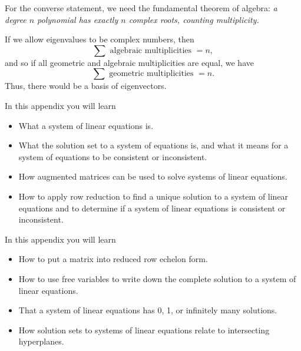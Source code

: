 \begin{parts}
\begin{solution}
				For the converse statement, we need the fundamental theorem of algebra:\emph{
					a degree $n$ polynomial has exactly $n$ complex roots, counting multiplicity.}

				If we allow eigenvalues to be complex numbers, then
				\[
					\sum \text{ algebraic multiplicities }= n,
				\]
				and so if all geometric and algebraic multiplicities are equal, we have
				\[
					\sum \text{ geometric multiplicities } = n.
				\]
				Thus, there would be a basis of eigenvectors.
			\end{solution}
	\end{parts}

\begin{appendix}

	In this appendix you will learn
	\begin{itemize}
		\item What a system of linear equations is.
		\item What the solution set to a system of equations is, and what it means for a system of equations
			to be consistent or inconsistent.
		\item How augmented matrices can be used to solve systems of linear equations.
		\item How to apply row reduction to find a unique solution to a system of linear
			equations and to determine if a system of linear equations is consistent or inconsistent.
	\end{itemize}

	
	
\end{appendix}

\begin{appendix}

	In this appendix you will learn
	\begin{itemize}
		\item How to put a matrix into reduced row echelon form.
		\item How to use free variables to write down the complete solution to a system of linear equations.
		\item That a system of linear equations has 0, 1, or infinitely many solutions.
		\item How solution sets to systems of linear equations relate to intersecting hyperplanes.
	\end{itemize}

	
	
\end{appendix}

